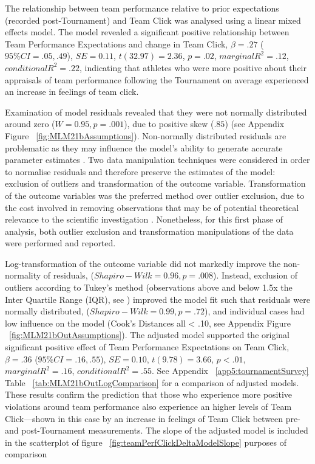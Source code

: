 The relationship between team performance relative to prior expectations (recorded post-Tournament) and Team Click was analysed using a linear mixed effects model. The model revealed a significant positive relationship between Team Performance Expectations and change in Team Click,  $\beta = .27$ ($95\% CI =  .05, .49$), $SE = 0.11$, $t(32.97) = 2.36$, $p = .02$, $marginal R^2 = .12$, $conditional R^2 = .22$, indicating that athletes who were more positive about their appraisals of team performance following the Tournament on average experienced an increase in feelings of team click.

Examination of model residuals revealed that they were not normally distributed around zero ($W = 0.95, p = .001$), due to positive skew ($.85$) (see Appendix Figure ~\ref{fig:MLM21bAssumptions}).  Non-normally distributed residuals are problematic as they may influence the model's ability to generate accurate parameter estimates . Two data manipulation techniques were considered in order to normalise residuals and therefore preserve the estimates of the model: exclusion of outliers and transformation of the outcome variable.  Transformation of the outcome variables was the preferred method over outlier exclusion, due to the cost involved in removing observations that may be of potential theoretical relevance to the scientific investigation \citep{Rousseeuw2011}. Nonetheless, for this first phase of analysis, both outlier exclusion and transformation manipulations of the data were performed and reported.

Log-transformation of the outcome variable did not markedly improve the non-normality of residuals, ($Shapiro-Wilk = 0.96, p = .008$).  Instead, exclusion of outliers according to Tukey's method (observations above and below 1.5x the Inter Quartile Range (IQR), see \citep{Tukey1977}) improved the model fit such that residuals were normally distributed, ($Shapiro-Wilk = 0.99, p = .72$), and individual cases had low influence on the model (Cook's Distances all < .10, see Appendix Figure ~\ref{fig:MLM21bOutAssumptions}).
The adjusted model supported the original significant positive effect of Team Performance Expectations on Team Click, $\beta = .36$ ($95\% CI =  .16, .55$), $SE = 0.10$, $t(9.78) = 3.66$, $p < .01$, $marginal R^2 = .16$, $conditional R^2 = .55$.
See Appendix ~\ref{app5:tournamentSurvey} Table ~\ref{tab:MLM21bOutLogComparison} for a comparison of adjusted models. These results confirm the prediction that those who experience more positive violations around team performance also experience an higher levels of Team Click---shown in this case by an increase in feelings of Team Click between pre- and post-Tournament measurements.  The slope of the adjusted model is included in the scatterplot of figure ~\ref{fig:teamPerfClickDeltaModelSlope} purposes of comparison


